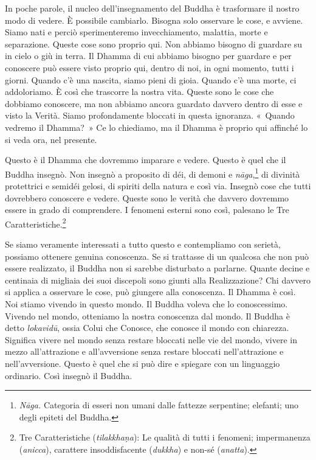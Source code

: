 In poche parole, il nucleo dell'insegnamento del Buddha è trasformare il
nostro modo di vedere. È possibile cambiarlo. Bisogna solo osservare le
cose, e avviene. Siamo nati e perciò sperimenteremo invecchiamento,
malattia, morte e separazione. Queste cose sono proprio qui. Non abbiamo
bisogno di guardare su in cielo o giù in terra. Il Dhamma di cui abbiamo
bisogno per guardare e per conoscere può essere visto proprio qui,
dentro di noi, in ogni momento, tutti i giorni. Quando c'è una nascita,
siamo pieni di gioia. Quando c'è una morte, ci addoloriamo. È così che
trascorre la nostra vita. Queste sono le cose che dobbiamo conoscere, ma
non abbiamo ancora guardato davvero dentro di esse e visto la Verità.
Siamo profondamente bloccati in questa ignoranza. «~Quando vedremo il
Dhamma?~» Ce lo chiediamo, ma il Dhamma è proprio qui affinché lo si
veda ora, nel presente.

Questo è il Dhamma che dovremmo imparare e vedere. Questo è quel che il
Buddha insegnò. Non insegnò a proposito di déi, di demoni e
\emph{nāga},\footnote{\emph{Nāga.} Categoria di esseri non umani dalle
  fattezze serpentine; elefanti; uno degli epiteti del Buddha.} di
divinità protettrici e semidéi gelosi, di spiriti della natura e così
via. Insegnò cose che tutti dovrebbero conoscere e vedere. Queste sono
le verità che davvero dovremmo essere in grado di comprendere. I
fenomeni esterni sono così, palesano le Tre Caratteristiche.\footnote{Tre
  Caratteristiche (\emph{tilakkhaṇa}): Le qualità di tutti i fenomeni;
  impermanenza (\emph{anicca}), carattere insoddisfacente
  (\emph{dukkha}) e non-sé (\emph{anatta}).}

Se siamo veramente interessati a tutto questo e contempliamo con
serietà, possiamo ottenere genuina conoscenza. Se si trattasse di un
qualcosa che non può essere realizzato, il Buddha non si sarebbe
disturbato a parlarne. Quante decine e centinaia di migliaia dei suoi
discepoli sono giunti alla Realizzazione? Chi davvero si applica a
osservare le cose, può giungere alla conoscenza. Il Dhamma è così. Noi
stiamo vivendo in questo mondo. Il Buddha voleva che lo conoscessimo.
Vivendo nel mondo, otteniamo la nostra conoscenza dal mondo. Il Buddha è
detto \emph{lokavidū}, ossia Colui che Conosce, che conosce il mondo con
chiarezza. Significa vivere nel mondo senza restare bloccati nelle vie
del mondo, vivere in mezzo all'attrazione e all'avversione senza restare
bloccati nell'attrazione e nell'avversione. Questo è quel che si può
dire e spiegare con un linguaggio ordinario. Così insegnò il Buddha.

